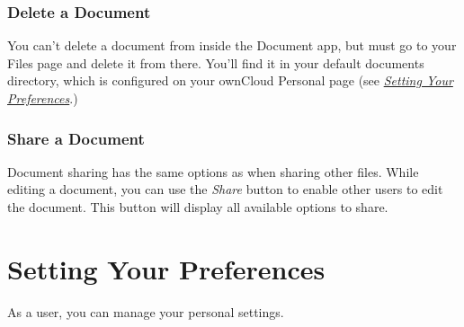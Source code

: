 \documentclass[letterpaper,10pt,english]{sphinxmanual}
\begin{document}
\subsection{Delete a Document}
\label{documents:delete-a-document}
You can't delete a document from inside the Document app, but must go to your
Files page and delete it from there. You'll find it in your default documents
directory, which is configured on your ownCloud Personal page (see
{\hyperref[userpreferences::doc]{\emph{Setting Your Preferences}}}.)


\subsection{Share a Document}
\label{documents:id1}\label{documents:share-a-document}
Document sharing has the same options as when sharing other files. While editing
a document, you can use the \emph{Share} button to enable other users to edit the
document. This button will display all available options to share.


\chapter{Setting Your Preferences}
\label{userpreferences:setting-your-preferences}\label{userpreferences::doc}
As a user, you can manage your personal settings.
\end{document}
